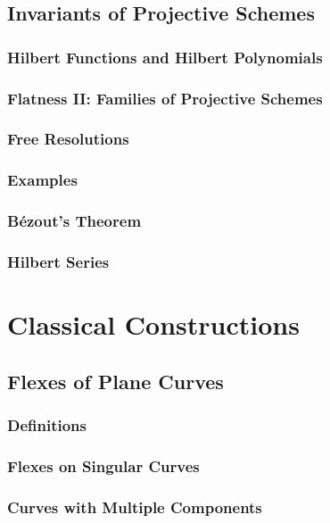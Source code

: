 \documentclass[oneside]{amsbook}
\numberwithin{ex}{chapter}
\begin{document}
\section{Invariants of Projective Schemes}
\subsection{Hilbert Functions and Hilbert Polynomials}

\subsection{Flatness II: Families of Projective Schemes}

\subsection{Free Resolutions}

\subsection{Examples}

\subsection{Bézout's Theorem}

\subsection{Hilbert Series}


\chapter{Classical Constructions}
\section{Flexes of Plane Curves}
\subsection{Definitions}

\subsection{Flexes on Singular Curves}

\subsection{Curves with Multiple Components}

\end{document}
